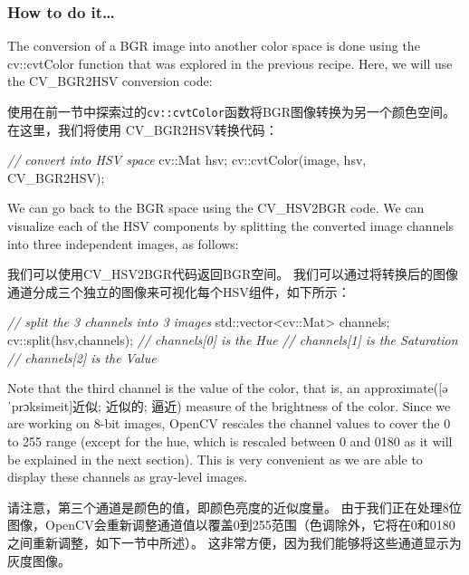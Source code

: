 \documentclass[]{article}
\newenvironment{Shaded}{}{}
\newcommand{\BuiltInTok}[1]{#1}
\newcommand{\CommentTok}[1]{\textcolor[rgb]{0.38,0.63,0.69}{\textit{#1}}}
\newcommand{\NormalTok}[1]{#1}
\begin{document}
\hypertarget{header-n1377}{%
\subsubsection{How to do it\ldots{}}\label{header-n1377}}

The conversion of a BGR image into another color space is done using the
cv::cvtColor function that was explored in the previous recipe. Here, we
will use the CV\_BGR2HSV conversion code:

使用在前一节中探索过的\texttt{cv::cvtColor}函数将BGR图像转换为另一个颜色空间。
在这里，我们将使用 CV\_BGR2HSV转换代码：

\begin{Shaded}
\begin{Highlighting}[]
\CommentTok{// convert into HSV space}
\NormalTok{cv::Mat hsv;}
\NormalTok{cv::cvtColor(image, hsv, CV_BGR2HSV);}
\end{Highlighting}
\end{Shaded}

We can go back to the BGR space using the CV\_HSV2BGR code. We can
visualize each of the HSV components by splitting the converted image
channels into three independent images, as follows:

我们可以使用CV\_HSV2BGR代码返回BGR空间。
我们可以通过将转换后的图像通道分成三个独立的图像来可视化每个HSV组件，如下所示：

\begin{Shaded}
\begin{Highlighting}[]
\CommentTok{// split the 3 channels into 3 images}
\BuiltInTok{std::}\NormalTok{vector<cv::Mat> channels;}
\NormalTok{cv::split(hsv,channels);}
\CommentTok{// channels[0] is the Hue}
\CommentTok{// channels[1] is the Saturation}
\CommentTok{// channels[2] is the Value}
\end{Highlighting}
\end{Shaded}

Note that the third channel is the value of the color, that is, an
approximate({[}əˈprɔksimeit{]}近似; 近似的; 逼近) measure of the
brightness of the color. Since we are working on 8-bit images, OpenCV
rescales the channel values to cover the 0 to 255 range (except for the
hue, which is rescaled between 0 and 0180 as it will be explained in the
next section). This is very convenient as we are able to display these
channels as gray-level images.

请注意，第三个通道是颜色的值，即颜色亮度的近似度量。
由于我们正在处理8位图像，OpenCV会重新调整通道值以覆盖0到255范围（色调除外，它将在0和0180之间重新调整，如下一节中所述）。
这非常方便，因为我们能够将这些通道显示为灰度图像。
\end{document}
